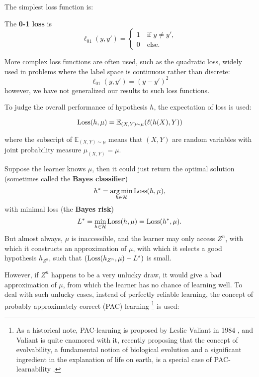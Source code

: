 The simplest loss function is:
\begin{defn}[0-1 loss]
The \textbf{0-1 loss} is 
\begin{equation}
\ell_{01}(y, y') = \begin{cases}
1 \quad \text{if } y \neq y',\\
0 \quad \text{else.}
\end{cases}
\end{equation}
\end{defn}
More complex loss functions are often used, such as the quadratic loss, widely used in problems where the label space is continuous rather than discrete:
\begin{equation}
\ell_{01}(y, y') = (y-y')^2
\end{equation}
however, we have not generalized our results to such loss functions.

To judge the overall performance of hypothesis $h$, the expectation of loss is used:
\begin{defn}
\begin{equation}
\operatorname{Loss}(h, \mu) = \mathbb{E}_{(X, Y)\sim \mu}(\ell(h(X), Y))
\end{equation}

where the subscript of $\mathbb{E}_{(X, Y)\sim \mu}$ means that $(X, Y)$ are random variables with joint probability measure $\mu_{(X, Y)} = \mu$.
\end{defn}

Suppose the learner knows $\mu$, then it could just return the optimal solution (sometimes called the \textbf{Bayes classifier})
$$h^* = \operatorname*{arg\,min}_{h\in \mathcal{H}} \operatorname{Loss}(h, \mu), $$
with minimal loss (the \textbf{Bayes risk})
$$L^* = \min_{h\in \mathcal{H}} \operatorname{Loss}(h, \mu) = \operatorname{Loss}(h^*, \mu).$$
But almost always, $\mu$ is inaccessible, and the learner may only access $Z^n$, with which it constructs an approximation of $\mu$, with which it selects a good hypothesis $h_{Z^n}$, such that $(\operatorname{Loss}(h_{Z^n}, \mu) - L^*)$ is small. 

However, if $Z^n$ happens to be a very unlucky draw, it would give a bad approximation of $\mu$, from which the learner has no chance of learning well. To deal with such unlucky cases, instead of perfectly reliable learning, the concept of probably approximately correct (PAC) learning
\footnote{As a historical note, PAC-learning is proposed by Leslie Valiant in 1984 \cite{valiantTheoryLearnable1984}, and Valiant is quite enamored with it, recently proposing that the concept of evolvability, a fundamental notion of biological evolution and a significant ingredient in the explanation of life on earth, is a special case of PAC-learnability \cite{valiantEvolvability2009}.}
 is used:

